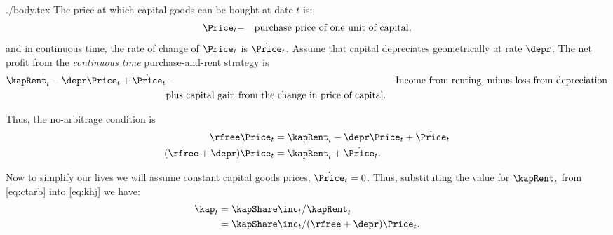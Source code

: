 \documentclass{handout}
\begin{document}
\begin{verbatimwrite}{./body.tex}
The price at which capital goods can be bought at date $t$ is: 
\begin{equation}\begin{gathered}\begin{aligned}
        \Price_{t} & - & \text{purchase price of one unit of capital},
\end{aligned}\end{gathered}\end{equation}
and in continuous time, the rate of change of $\Price_{t}$ is $\dot{\Price}_{t}$.  Assume
that capital depreciates geometrically at rate $\depr$.  The net profit
from the {\it continuous time} purchase-and-rent strategy is
\begin{equation}\begin{gathered}\begin{aligned}
        \kapRent_{t}-\depr \Price_{t}+\dot{\Price}_{t} & - & \text{Income from renting, minus loss from depreciation}  \\
         &   \text{plus capital gain from the change in price of capital}. \nonumber
\end{aligned}\end{gathered}\end{equation}

\thispagestyle{empty}

Thus, the no-arbitrage condition is 
\begin{equation}\begin{gathered}\begin{aligned}
        \rfree \Price_{t} & =  \kapRent_{t} - \depr \Price_{t} + \dot{\Price}_{t} 
\\  (\rfree+\depr) \Price_{t} & =  \kapRent_{t}+\dot{\Price}_{t}     \label{eq:ctarb}.
\end{aligned}\end{gathered}\end{equation}

Now to simplify our lives we will assume constant capital goods 
prices, $\dot{\Price}_{t}=0$.  Thus, substituting the value for $\kapRent_{t}$ from
\eqref{eq:ctarb} into \eqref{eq:khj} we have:
\begin{equation}\begin{gathered}\begin{aligned}
        \kap_{t} & =  \kapShare \inc_{t}/\kapRent_{t}  \\
         & =  \kapShare \inc_{t}/(\rfree+\depr)\Price_{t}.
\end{aligned}\end{gathered}\end{equation}



\end{verbatimwrite}
\end{document}
